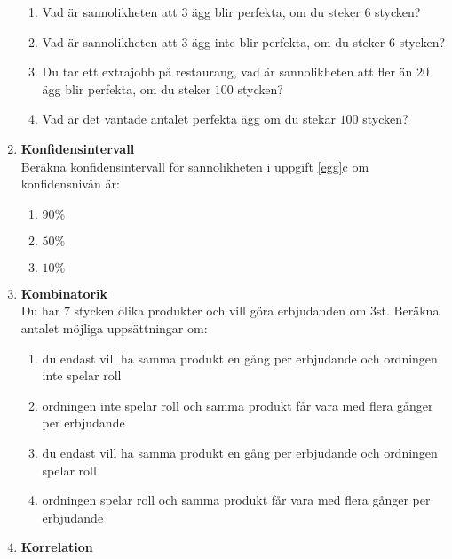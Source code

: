 \documentclass[a4paper,10pt]{article}
\begin{document}
\begin{enumerate}
\begin{enumerate}
        \item{Vad är sannolikheten att $3$ ägg blir perfekta, om du steker $6$ stycken?}
        \vspace{15cm}
        \item{Vad är sannolikheten att $3$ ägg inte blir perfekta, om du steker $6$ stycken?}
        \newpage
        \item{Du tar ett extrajobb på restaurang, vad är sannolikheten att fler än $20$ ägg blir perfekta, om du steker $100$ stycken?}
        \vspace{15cm}
        \item{Vad är det väntade antalet perfekta ägg om du stekar $100$ stycken?}
    \end{enumerate}
    \newpage
    \item{{\bf Konfidensintervall}\\Beräkna konfidensintervall för sannolikheten i uppgift \ref{egg}c om konfidensnivån är:}
    \begin{enumerate}
        \item{$90\%$}
        \vspace{6cm}
        \item{$50\%$}
        \vspace{6cm}
        \item{$10\%$}
    \end{enumerate}
    \newpage
    \item{{\bf Kombinatorik} \\ Du har $7$ stycken olika produkter och vill göra erbjudanden om $3$st. Beräkna antalet möjliga uppsättningar om:}
    \begin{enumerate}
        \item{du endast vill ha samma produkt en gång per erbjudande och ordningen inte spelar roll}
        \vspace{4cm}
        \item{ordningen inte spelar roll och samma produkt får vara med flera gånger per erbjudande}
        \vspace{4cm}
        \item{du endast vill ha samma produkt en gång per erbjudande och ordningen spelar roll}
        \vspace{4cm}
        \item{ordningen spelar roll och samma produkt får vara med flera gånger per erbjudande}
    \end{enumerate}
    \newpage
    \item{{\bf Korrelation} \\
}
\end{enumerate}
\end{document}

